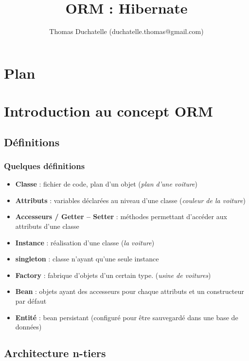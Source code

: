 \documentclass[compress]{beamer}%
\title{ORM : Hibernate}
\author{Thomas Duchatelle (duchatelle.thomas@gmail.com)}
\institute{Capgemini, pour Yves Rocher}
\begin{document}
\frame{\titlepage}
  
\section*{Plan}
\frame{\tableofcontents[hideallsubsections]}
	
\section{Introduction au concept ORM}
	
\subsection{Définitions}
		
\begin{frame}
	\frametitle{Quelques définitions}
	\begin{itemize}[<+->]
	\item \textbf{Classe} : fichier de code, plan d'un objet (\emph{plan d'une voiture})
	\item \textbf{Attributs} : variables déclarées au niveau d'une classe (\emph{couleur de la voiture})
	\item \textbf{Accesseurs / Getter -- Setter} : méthodes permettant d'accéder aux attributs d'une classe
	\item \textbf{Instance} : réalisation d'une classe (\emph{la voiture})
	\item \textbf{singleton} : classe n'ayant qu'une seule instance
	\item \textbf{Factory} : fabrique d'objets d'un certain type. (\emph{usine de voitures}) %
	\item \textbf{Bean} : objets ayant des accesseurs pour chaque attributs et un constructeur par défaut
	\item \textbf{Entité} : bean persistant (configuré pour être sauvegardé dans une base de données)
	\end{itemize}
\end{frame}
	
\subsection{Architecture n-tiers}
\end{document}
